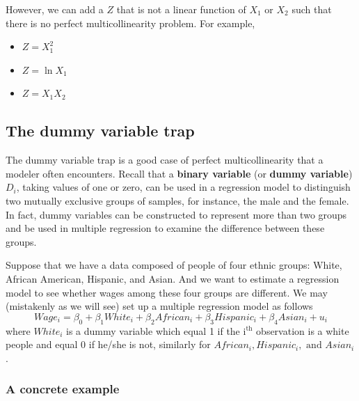 \documentclass[a4paper,11pt]{article}
\begin{document}
However, we can add a \(Z\) that is not a linear function of \(X_1\) or
\(X_2\) such that there is no perfect multicollinearity problem. For example,
\begin{itemize}
\item \(Z = X_1^2\)
\item \(Z = \ln X_1\)
\item \(Z = X_1 X_2\)
\end{itemize}


\subsection{The dummy variable trap}
\label{sec:org50839b1}
The dummy variable trap is a good case of perfect multicollinearity
that a modeler often encounters. Recall that a \textbf{binary variable} (or
\textbf{dummy variable}) \(D_i\), taking values of one or zero, can be used in
a regression model to distinguish two mutually exclusive groups of
samples, for instance, the male and the female. In fact, dummy
variables can be constructed to represent more than two groups and be
used in multiple regression to examine the difference between these
groups.

Suppose that we have a data composed of people of four ethnic groups:
White, African American, Hispanic, and Asian. And we want to estimate
a regression model to see whether wages among these four groups are
different. We may (mistakenly as we will see) set up a multiple
regression model as follows
\begin{equation}
\label{eq:dummy-trap}
Wage_i = \beta_0 + \beta_1 White_i + \beta_2 African_i + \beta_3 Hispanic_i + \beta_4 Asian_i + u_i
\end{equation}
where \(White_i\) is a dummy variable which equal 1 if the i\(^{\text{th}}\)
observation is a white people and equal 0 if he/she is not, similarly
for \(African_i, Hispanic_i, \text{ and } Asian_i\).

\subsubsection*{A concrete example}
\label{sec:org1b8a58a}
\end{document}
